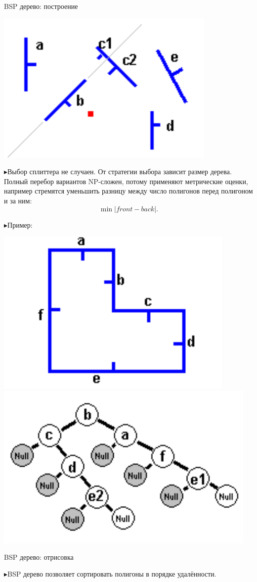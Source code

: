 \documentclass{beamer}
\newcommand{\tri}{{\color{blue!40} $\blacktriangleright$}\:}
\begin{document}
\begin{frame}{BSP дерево: построение}
\footnotesize

\begin{center}
\includegraphics[scale=0.3]{img2}
\end{center}
\tri Выбор сплиттера не случаен. От стратегии выбора зависит размер дерева. Полный перебор вариантов NP-сложен, потому применяют метрические оценки, например стремятся уменьшить разницу между число полигонов перед полигоном и за ним:
\begin{equation}\nonumber
    \min |front - back|.
\end{equation}

\tri Пример:
\begin{center}
\includegraphics[scale=0.3]{img4}
\includegraphics[scale=0.3]{img5}
\end{center}

\end{frame}





\begin{frame}{BSP дерево: отрисовка}
\footnotesize

\tri BSP дерево позволяет сортировать полигоны в порядке удалённости.

\end{frame}
\end{document}
